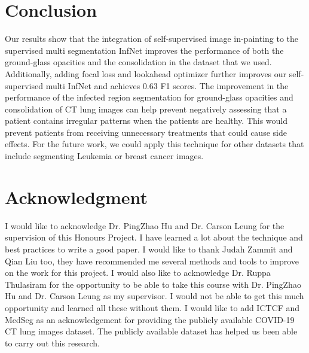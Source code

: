 \section{Conclusion}
Our results show that the integration of self-supervised image in-painting to the supervised multi segmentation InfNet improves the performance of both the ground-glass opacities and the consolidation in the dataset that we used. Additionally, adding focal loss and lookahead optimizer further improves our self-supervised multi InfNet and achieves 0.63 F1 scores. The improvement in the performance of the infected region segmentation for ground-glass opacities and consolidation of CT lung images can help prevent negatively assessing that a patient contains irregular patterns when the patients are healthy. This would prevent patients from receiving unnecessary treatments that could cause side effects. For the future work, we could apply this technique for other datasets that include segmenting Leukemia or breast cancer images.

\section*{Acknowledgment}
I would like to acknowledge Dr. PingZhao Hu and Dr. Carson Leung for the supervision of this Honours Project. I have learned a lot about the technique and best practices to write a good paper. I would like to thank Judah Zammit and Qian Liu too, they have recommended me several methods and tools to improve on the work for this project. I would also like to acknowledge Dr. Ruppa Thulasiram for the opportunity to be able to take this course with Dr. PingZhao Hu and Dr. Carson Leung as my supervisor. I would not be able to get this much opportunity and learned all these without them. I would like to add ICTCF and MedSeg as an acknowledgement for providing the publicly available COVID-19 CT lung images dataset. The publicly available dataset has helped us been able to carry out this research.